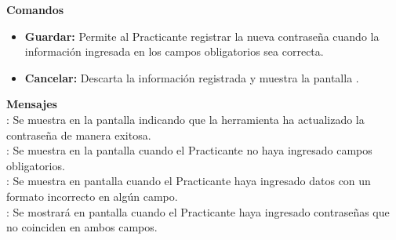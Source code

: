\textbf{\textcolor[rgb]{0, 0, 0.545098}{Comandos}}	
\begin{itemize}
	\item \textbf{\textcolor[rgb]{0, 0, 0.545098}{Guardar:}} Permite al Practicante registrar la nueva contraseña cuando la información ingresada en los campos obligatorios sea correcta.
	\item \textbf{\textcolor[rgb]{0, 0, 0.545098}{Cancelar:}} Descarta la información registrada y muestra la pantalla .
\end{itemize}
\vspace{1em}

\textbf{\textcolor[rgb]{0, 0, 0.545098}{Mensajes}}\\

\textbf{}: Se muestra en la pantalla  indicando que la herramienta ha actualizado la contraseña de manera exitosa.\\

\textbf{}: Se muestra en la pantalla  cuando el Practicante no haya ingresado campos obligatorios.\\

\textbf{}: Se muestra en pantalla cuando el Practicante haya ingresado datos con un formato incorrecto en algún campo.\\

\textbf{}: Se mostrará en pantalla cuando el Practicante haya ingresado contraseñas que no coinciden en ambos campos.\\

\clearpage